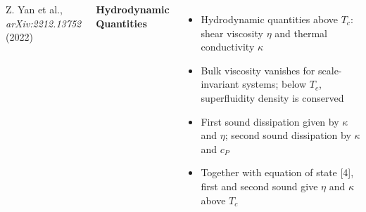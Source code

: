 \documentclass[26pt, paperwidth=36in,paperheight=48in]{tikzposter} %
\newcommand{\myfont}{\fontsize{24}{30}\selectfont}
\begin{document}
\begin{columns}
{		\hspace{12.0 cm} Z. Yan et al., \textit{arXiv:2212.13752} (2022)
	}
	
	
	
	
	


	
	
	
	

	
	\block[]{\textcolor{BEC1blue}{Hydrodynamics -- Transport Properties}}
	{
		\begin{minipage}{0.38\textwidth}
			\flushleft
			\textbf{Hydrodynamic Quantities}
			\vspace{0.5cm}
			\myfont
			\begin{itemize}
				\item Hydrodynamic quantities above $T_c$: shear viscosity $\eta$ and thermal conductivity $\kappa$
				
				\item Bulk viscosity vanishes for scale-invariant systems; below $T_c$, superfluidity density is conserved 
				
				\item First sound dissipation given by $\kappa$ and $\eta$; second sound dissipation by $\kappa$ and $c_P$
				
				\item Together with equation of state [4], first and second sound give $\eta$ and $\kappa$ above $T_c$
			\end{itemize}
		\end{minipage}
		
}
\end{columns}
\end{document}
